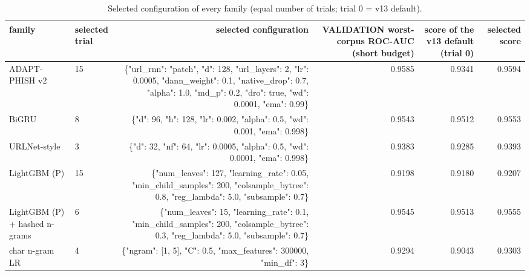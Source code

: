 \begin{table}[t]
\centering
\scriptsize
\caption{Selected configuration of every family (equal number of trials; trial 0 = v13 default).}
\label{tab:rev_R15_v14_selected_configs}
\begin{tabular}{llrrrr}
\toprule
family & selected trial & selected configuration & VALIDATION worst-corpus ROC-AUC (short budget) & score of the v13 default (trial 0) & selected score \\
\midrule
ADAPT-PHISH v2 & 15 & \{"url\_rnn": "patch", "d": 128, "url\_layers": 2, "lr": 0.0005, "dann\_weight": 0.1, "native\_drop": 0.7, "alpha": 1.0, "md\_p": 0.2, "dro": true, "wd": 0.0001, "ema": 0.99\} & 0.9585 & 0.9341 & 0.9594 \\
BiGRU & 8 & \{"d": 96, "h": 128, "lr": 0.002, "alpha": 0.5, "wd": 0.001, "ema": 0.998\} & 0.9543 & 0.9512 & 0.9553 \\
URLNet-style & 3 & \{"d": 32, "nf": 64, "lr": 0.0005, "alpha": 0.5, "wd": 0.0001, "ema": 0.998\} & 0.9383 & 0.9285 & 0.9393 \\
LightGBM (P) & 15 & \{"num\_leaves": 127, "learning\_rate": 0.05, "min\_child\_samples": 200, "colsample\_bytree": 0.8, "reg\_lambda": 5.0, "subsample": 0.7\} & 0.9198 & 0.9180 & 0.9207 \\
LightGBM (P) + hashed n-grams & 6 & \{"num\_leaves": 15, "learning\_rate": 0.1, "min\_child\_samples": 200, "colsample\_bytree": 0.3, "reg\_lambda": 5.0, "subsample": 0.7\} & 0.9545 & 0.9513 & 0.9555 \\
char n-gram LR & 4 & \{"ngram": [1, 5], "C": 0.5, "max\_features": 300000, "min\_df": 3\} & 0.9294 & 0.9043 & 0.9303 \\
\bottomrule
\end{tabular}
\end{table}